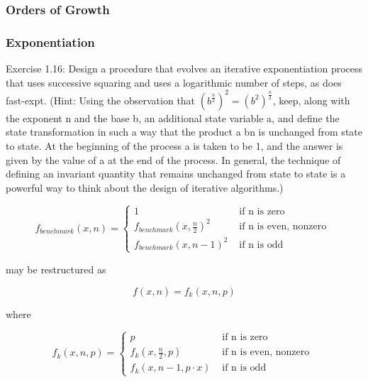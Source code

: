             \subsubsection{Orders of Growth}
            \subsubsection{Exponentiation}
Exercise 1.16:  Design a procedure that evolves an iterative exponentiation process that uses successive squaring and uses a logarithmic number of steps, as does fast-expt.  (Hint: Using the observation that $\left(b^{\frac{n}{2}}\right)^2 = \left(b^2\right)^{\frac{n}{2}}$, keep, along with the exponent n and the base b, an additional state variable a, and define the state transformation in such a way that the product a bn is unchanged from state to state. At the beginning of the process a is taken to be 1, and the answer is given by the value of a at the end of the process. In general, the technique of defining an invariant quantity that remains unchanged from state to state is a powerful way to think about the design of iterative algorithms.)

\begin{equation}
f_{benchmark}\left(x,n\right) =
\begin{cases}
1 & \mbox{ if n is zero } \\
f_{benchmark}\left(x,\frac{n}{2}\right)^{2} & \mbox{ if n is even, nonzero } \\
f_{benchmark}\left(x,n-1\right)^{2} & \mbox{ if n is odd }
\end{cases}
\label{eq:fast_expt_benchmark}
\end{equation}

may be restructured as

\begin{equation}
f\left(x,n\right) = f_{k}\left(x,n,p\right)
\label{eq:fast_expt_fast}
\end{equation}

where

\begin{equation}
f_{k}\left(x,n,p\right) =
\begin{cases}
p & \mbox{ if n is zero } \\
f_{k}\left(x,\frac{n}{2},p\right) & \mbox{ if n is even, nonzero } \\
f_{k}\left(x,n-1,p \cdot x\right) & \mbox{ if n is odd }
\end{cases}
\label{eq:fast_expt_fast_recur}
\end{equation}

